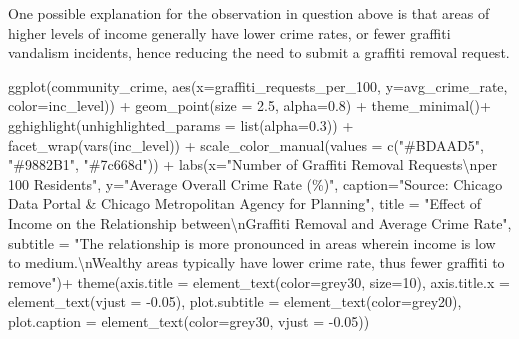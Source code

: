 \documentclass[
]{report}
\newenvironment{Shaded}{}{}
\newcommand{\AttributeTok}[1]{\textcolor[rgb]{0.84,0.23,0.29}{#1}}
\newcommand{\DecValTok}[1]{\textcolor[rgb]{0.00,0.36,0.77}{#1}}
\newcommand{\FloatTok}[1]{\textcolor[rgb]{0.00,0.36,0.77}{#1}}
\newcommand{\FunctionTok}[1]{\textcolor[rgb]{0.44,0.26,0.76}{#1}}
\newcommand{\NormalTok}[1]{\textcolor[rgb]{0.14,0.16,0.18}{#1}}
\newcommand{\SpecialCharTok}[1]{\textcolor[rgb]{0.00,0.36,0.77}{#1}}
\newcommand{\StringTok}[1]{\textcolor[rgb]{0.01,0.18,0.38}{#1}}
\begin{document}
One possible explanation for the observation in question above is that
areas of higher levels of income generally have lower crime rates, or
fewer graffiti vandalism incidents, hence reducing the need to submit a
graffiti removal request.

\begin{Shaded}
\begin{Highlighting}[]
\FunctionTok{ggplot}\NormalTok{(community\_crime, }\FunctionTok{aes}\NormalTok{(}\AttributeTok{x=}\NormalTok{graffiti\_requests\_per\_100, }\AttributeTok{y=}\NormalTok{avg\_crime\_rate, }\AttributeTok{color=}\NormalTok{inc\_level)) }\SpecialCharTok{+}
  \FunctionTok{geom\_point}\NormalTok{(}\AttributeTok{size =} \FloatTok{2.5}\NormalTok{, }\AttributeTok{alpha=}\FloatTok{0.8}\NormalTok{) }\SpecialCharTok{+}
  \FunctionTok{theme\_minimal}\NormalTok{()}\SpecialCharTok{+}
  \FunctionTok{gghighlight}\NormalTok{(}\AttributeTok{unhighlighted\_params =} \FunctionTok{list}\NormalTok{(}\AttributeTok{alpha=}\FloatTok{0.3}\NormalTok{)) }\SpecialCharTok{+} 
  \FunctionTok{facet\_wrap}\NormalTok{(}\FunctionTok{vars}\NormalTok{(inc\_level)) }\SpecialCharTok{+}
  \FunctionTok{scale\_color\_manual}\NormalTok{(}\AttributeTok{values =} \FunctionTok{c}\NormalTok{(}\StringTok{"\#BDAAD5"}\NormalTok{, }\StringTok{"\#9882B1"}\NormalTok{, }\StringTok{"\#7c668d"}\NormalTok{)) }\SpecialCharTok{+}
  \FunctionTok{labs}\NormalTok{(}\AttributeTok{x=}\StringTok{"Number of Graffiti Removal Requests}\SpecialCharTok{\textbackslash{}n}\StringTok{per 100 Residents"}\NormalTok{,}
       \AttributeTok{y=}\StringTok{"Average Overall Crime Rate (\%)"}\NormalTok{,}
       \AttributeTok{caption=}\StringTok{"Source: Chicago Data Portal \& Chicago Metropolitan Agency for Planning"}\NormalTok{,}
       \AttributeTok{title =} \StringTok{"Effect of Income on the Relationship between}\SpecialCharTok{\textbackslash{}n}\StringTok{Graffiti Removal and Average Crime Rate"}\NormalTok{,}
       \AttributeTok{subtitle =} \StringTok{"The relationship is more pronounced in areas wherein income is low to medium.}\SpecialCharTok{\textbackslash{}n}\StringTok{Wealthy areas typically have lower crime rate, thus fewer graffiti to remove"}\NormalTok{)}\SpecialCharTok{+}
  \FunctionTok{theme}\NormalTok{(}\AttributeTok{axis.title =} \FunctionTok{element\_text}\NormalTok{(}\AttributeTok{color=}\StringTok{\textquotesingle{}grey30\textquotesingle{}}\NormalTok{, }\AttributeTok{size=}\DecValTok{10}\NormalTok{),}
        \AttributeTok{axis.title.x =} \FunctionTok{element\_text}\NormalTok{(}\AttributeTok{vjust =} \SpecialCharTok{{-}}\FloatTok{0.05}\NormalTok{),}
        \AttributeTok{plot.subtitle =} \FunctionTok{element\_text}\NormalTok{(}\AttributeTok{color=}\StringTok{\textquotesingle{}grey20\textquotesingle{}}\NormalTok{),}
        \AttributeTok{plot.caption =} \FunctionTok{element\_text}\NormalTok{(}\AttributeTok{color=}\StringTok{\textquotesingle{}grey30\textquotesingle{}}\NormalTok{, }\AttributeTok{vjust =} \SpecialCharTok{{-}}\FloatTok{0.05}\NormalTok{))}
\end{Highlighting}
\end{Shaded}
\end{document}
